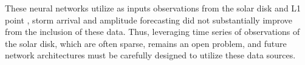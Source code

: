 \documentclass[draft,linenumbers]{agujournal2018}
\begin{document}
These neural networks utilize as inputs observations from  the solar disk and L1 point , storm arrival and amplitude forecasting did not substantially improve from the inclusion of these data. Thus, leveraging time series of observations of the solar disk, which are often sparse, remains an open problem, and future network architectures must be carefully designed to utilize these data sources. 





%
%
%
%
%
%
%
%
\end{document}
